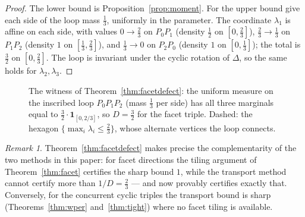 \documentclass[11pt,reqno]{amsart}
\theoremstyle{plain}
\theoremstyle{definition}
\theoremstyle{remark}
\newtheorem{remark}[theorem]{Remark}
\begin{document}
\begin{proof}
The lower bound is Proposition~\ref{prop:moment}. For the upper bound give each
side of the loop mass $\tfrac13$, uniformly in the parameter. The coordinate
$\lambda_1$ is affine on each side, with values $0\to\tfrac23$ on $P_0P_1$
(density $\tfrac12$ on $[0,\tfrac23]$), $\tfrac23\to\tfrac13$ on $P_1P_2$
(density $1$ on $[\tfrac13,\tfrac23]$), and $\tfrac13\to0$ on $P_2P_0$ (density
$1$ on $[0,\tfrac13]$); the total is $\tfrac32$ on $[0,\tfrac23]$. The loop is
invariant under the cyclic rotation of $\Delta$, so the same holds for
$\lambda_2,\lambda_3$.
\end{proof}

\begin{figure}[ht]
\centering
{}
\caption{The witness of Theorem~\ref{thm:facetdefect}: the uniform measure on
the inscribed loop $P_0P_1P_2$ (mass $\tfrac13$ per side) has all three
marginals equal to $\tfrac32\cdot\mathbf1_{[0,2/3]}$, so $D=\tfrac32$ for the
facet triple. Dashed: the hexagon $\{\max_i\lambda_i\le\tfrac23\}$, whose
alternate vertices the loop connects.}
\label{fig:loop}
\end{figure}

\begin{remark}\label{rem:complement}
Theorem~\ref{thm:facetdefect} makes precise the complementarity of the two
methods in this paper: for facet directions the tiling argument of
Theorem~\ref{thm:facet} certifies the sharp bound $1$, while the transport
method cannot certify more than $1/D=\tfrac23$ --- and now provably certifies
exactly that. Conversely, for the concurrent cyclic triples the transport bound is
sharp (Theorems~\ref{thm:wper} and~\ref{thm:tight}) where no facet tiling is
available.
\end{remark}
\end{document}
